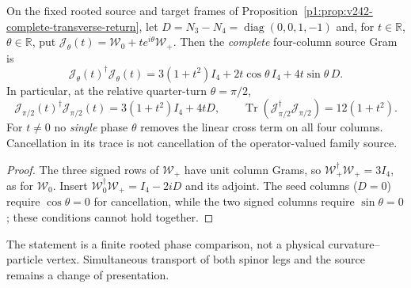 \documentclass[11pt]{article}
\begin{document}
\begin{corollary}
\label{p1:cor:v244-quarter-turn-full-gram}
On the fixed rooted source and target frames of
Proposition~\ref{p1:prop:v242-complete-transverse-return}, let
\(D=N_3-N_4=\operatorname{diag}(0,0,1,-1)\) and, for
\(t\in\mathbb R\), \(\theta\in\mathbb R\), put
\(\mathcal J_\theta(t)=\mathcal W_0+t e^{i\theta}\mathcal W_+\).
Then the \emph{complete} four-column source Gram is
\[
 \boxed{\mathcal J_\theta(t)^\dagger\mathcal J_\theta(t)
 =3(1+t^2)I_4+2t\cos\theta\,I_4+4t\sin\theta\,D.}
\]
In particular, at the relative quarter-turn \(\theta=\pi/2\),
\[
 \boxed{\mathcal J_{\pi/2}(t)^\dagger\mathcal J_{\pi/2}(t)
 =3(1+t^2)I_4+4tD,\qquad
 \operatorname{Tr}(\mathcal J_{\pi/2}^\dagger\mathcal J_{\pi/2})
 =12(1+t^2).}
\]
For \(t\ne0\) no \emph{single} phase \(\theta\) removes the
linear cross term on all four columns.  Cancellation in its trace
is not cancellation of the operator-valued family source.
\end{corollary}
\begin{proof}
The three signed rows of \(\mathcal W_+\) have unit column Grams,
so \(\mathcal W_+^\dagger\mathcal W_+=3I_4\), as for
\(\mathcal W_0\).  Insert
\(\mathcal W_0^\dagger\mathcal W_+=I_4-2iD\) and its adjoint.
The seed columns (\(D=0\)) require \(\cos\theta=0\) for
cancellation, while the two signed columns require
\(\sin\theta=0\); these conditions cannot hold together.
\end{proof}
The statement is a finite rooted phase comparison, not a physical
curvature--particle vertex.  Simultaneous transport of both spinor
legs and the source remains a change of presentation.
\end{document}
